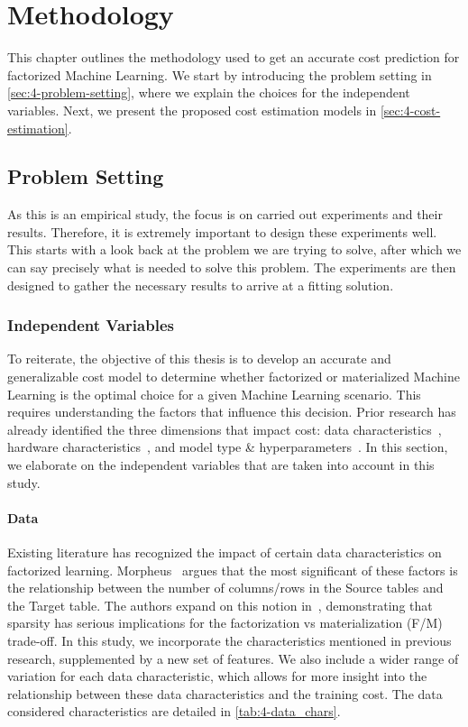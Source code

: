 
\chapter{Methodology}

\label{chapter:methodology}

This chapter outlines the methodology used to get an accurate cost prediction for factorized Machine Learning. We start by introducing the problem setting in \autoref{sec:4-problem-setting}, where we explain the choices for the independent variables. Next, we present the proposed cost estimation models in \autoref{sec:4-cost-estimation}.

\section{Problem Setting}
\label{sec:4-problem-setting}

As this is an empirical study, the focus is on carried out experiments and their results. Therefore, it is extremely important to design these experiments well. This starts with a look back at the problem we are trying to solve, after which we can say precisely what is needed to solve this problem. The experiments are then designed to gather the necessary results to arrive at a fitting solution.

\subsection{Independent Variables}
To reiterate, the objective of this thesis is to develop an accurate and generalizable cost model to determine whether factorized or materialized Machine Learning is the optimal choice for a given Machine Learning scenario. This requires understanding the factors that influence this decision. Prior research has already identified the three dimensions that impact cost: data characteristics~\cite{morpheus, amalur,amalur_tkde24}, hardware characteristics~\cite{orion_learning_gen_lin_models}, and model type \& hyperparameters~\cite{amalur,amalur_tkde24}. In this section, we elaborate on the independent variables that are taken into account in this study.

\subsubsection{Data}
Existing literature has recognized the impact of certain data characteristics on factorized learning. Morpheus~\cite{morpheus} argues that the most significant of these factors is the relationship between the number of columns/rows in the Source tables and the Target table. The authors expand on this notion in~\cite{MorpheusFI}, demonstrating that sparsity has serious implications for the factorization vs materialization (F/M) trade-off. In this study, we incorporate the characteristics mentioned in previous research, supplemented by a new set of features. We also include a wider range of variation for each data characteristic, which allows for more insight into the relationship between these data characteristics and the training cost. The data considered characteristics are detailed in \autoref{tab:4-data_chars}.

